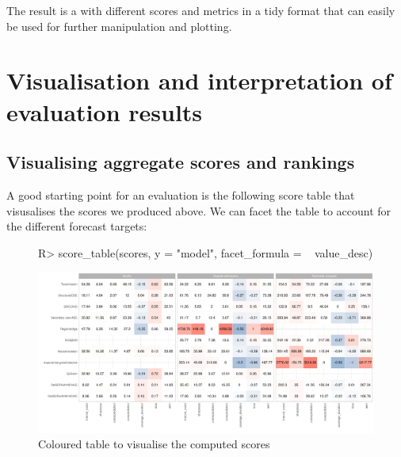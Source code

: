 \documentclass[article,shortnames]{jss}
\begin{document}
The result is a  with different scores and metrics in a tidy format that can easily be used for further manipulation and plotting. 

\section{Visualisation and interpretation of evaluation results}

\subsection{Visualising aggregate scores and rankings}
A good starting point for an evaluation is the following score table that visusalises the scores we produced above. We can facet the table to account for the different forecast targets: 

\begin{figure}[h]
\centering
\begin{Schunk}
\begin{Sinput}
R> score_table(scores, y = "model", facet_formula = ~ value_desc)
\end{Sinput}
\end{Schunk}
\includegraphics{plots/plot-score-table}
\caption{\label{fig:score-table} Coloured table to visualise the computed scores}
\end{figure}
\end{document}
